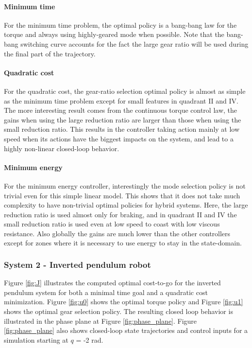 \paragraph{Minimum time}
\label{sec:MinimumTime}
For the minimum time problem, the optimal policy is a bang-bang law for the torque and always using highly-geared mode when possible. Note that the bang-bang switching curve accounts for the fact the large gear ratio will be used during the final part of the trajectory.

\paragraph{Quadratic cost}
\label{sec:QuadraticCost}
For the quadratic cost, the gear-ratio selection optimal policy is almost as simple as the minimum time problem except for small features in quadrant II and IV. The more interesting result comes from the continuous torque control law, the gains when using the large reduction ratio are larger than those when using the small reduction ratio. This results in the controller taking action mainly at low speed when its actions have the biggest impacts on the system, and lead to a highly non-linear closed-loop behavior.

\paragraph{Minimum energy}
\label{sec:MinimumEnergy}
For the minimum energy controller, interestingly the mode selection policy is not trivial even for this simple linear model.  This shows that it does not take much complexity to have non-trivial optimal policies for hybrid systems. Here, the large reduction ratio is used almost only for braking, and in quadrant II and IV the small reduction ratio is used even at low speed to coast with low viscous resistance. Also globally the gains are much lower than the other controllers except for zones where it is necessary to use energy to stay in the state-domain. 

\subsubsection{System 2 - Inverted pendulum robot}
%
Figure \ref{fig:J} illustrates the computed optimal cost-to-go for the inverted pendulum system for both a minimal time goal and a quadratic cost minimization. Figure \ref{fig:u0} shows the optimal torque policy and Figure \ref{fig:u1} shows the optimal gear selection policy. The resulting closed loop behavior is illustrated in the phase plane at Figure \ref{fig:phase_plane}. Figure \ref{fig:phase_plane} also shows closed-loop state trajectories and control inputs for a simulation starting at $q$ = -2 rad.

